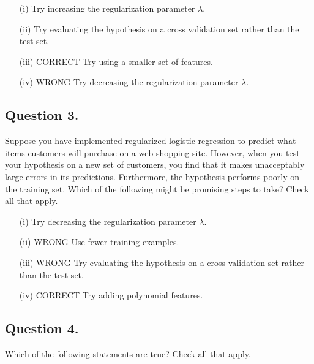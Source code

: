 \documentclass[11pt]{article} %
\begin{document}
\begin{itemize}
\item[(i)] 
Try increasing the regularization parameter $\lambda$.
\item[(ii)] 
Try evaluating the hypothesis on a cross validation set rather than the test set.
\item[(iii)] 
CORRECT Try using a smaller set of features.
\item[(iv)] WRONG
Try decreasing the regularization parameter $\lambda$.
\end{itemize}
\subsection*{Question 3. }
Suppose you have implemented regularized logistic regression to predict what items customers will purchase on a web shopping site. However, when you test your hypothesis on a new set of customers, you find that it makes unacceptably large errors in its predictions. Furthermore, the hypothesis performs poorly on the training set. Which of the following might be promising steps to take? Check all that apply.

\begin{itemize}
\item[(i)] Try decreasing the regularization parameter $\lambda$.

\item[(ii)] WRONG Use fewer training examples.

\item[(iii)] WRONG Try evaluating the hypothesis on a cross validation set rather than the test set.

\item[(iv)] CORRECT Try adding polynomial features.
\end{itemize}
\subsection*{Question 4. }
Which of the following statements are true? Check all that apply.
\end{document}
